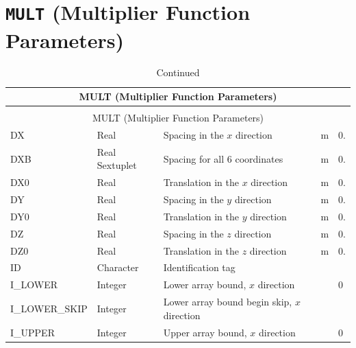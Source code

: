 \documentclass[11pt]{book}
\begin{document}
\section{\texorpdfstring{{\tt MULT}}{MULT} (Multiplier Function Parameters)}

\begin{longtable}{@{\extracolsep{\fill}}|l|l|l|l|l|}
\caption[Multiplier function parameters ({\ct MULT} namelist group)]{For more information see Section~\ref{info:MULT}.}
\label{tbl:MULT} \\
\hline
\multicolumn{5}{|c|}{{\ct MULT} (Multiplier Function Parameters)} \\
\hline \hline
\endfirsthead
\caption[]{Continued} \\
\hline
\multicolumn{5}{|c|}{{\ct MULT} (Multiplier Function Parameters)} \\
\hline \hline
\endhead
{\ct DX}             & Real             & Spacing in the $x$ direction                & m  & 0.                         \\ \hline
{\ct DXB}            & Real Sextuplet   & Spacing for all 6 coordinates               & m  & 0.                         \\ \hline
{\ct DX0}            & Real             & Translation in the $x$ direction            & m  & 0.                         \\ \hline
{\ct DY}             & Real             & Spacing in the $y$ direction                & m  & 0.                         \\ \hline
{\ct DY0}            & Real             & Translation in the $y$ direction            & m  & 0.                         \\ \hline
{\ct DZ}             & Real             & Spacing in the $z$ direction                & m  & 0.                         \\ \hline
{\ct DZ0}            & Real             & Translation in the $z$ direction            & m  & 0.                         \\ \hline
{\ct ID }            & Character        & Identification tag                          &    &                            \\ \hline
{\ct I\_LOWER}       & Integer          & Lower array bound, $x$ direction            &    & 0                          \\ \hline
{\ct I\_LOWER\_SKIP} & Integer          & Lower array bound begin skip, $x$ direction &    &                            \\ \hline
{\ct I\_UPPER}       & Integer          & Upper array bound, $x$ direction            &    & 0                          \\ \hline

\end{longtable}
\end{document}
